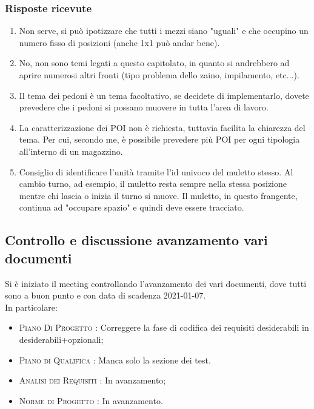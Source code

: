 \subsubsection{Risposte ricevute}
\begin{enumerate}
	\item Non serve, si può ipotizzare che tutti i mezzi siano "uguali" e che occupino un numero fisso di posizioni (anche 1x1 può andar bene).
	
	\item No, non sono temi legati a questo capitolato, in quanto si andrebbero ad aprire numerosi altri fronti (tipo problema dello zaino, impilamento, etc...).
	
	\item Il tema dei pedoni è un tema facoltativo, se decidete di implementarlo, dovete prevedere che i pedoni si possano muovere in tutta l'area di lavoro. 
	
	\item La caratterizzazione dei POI non è richiesta, tuttavia facilita la chiarezza del tema. Per cui, secondo me, è possibile prevedere più POI per ogni tipologia all'interno di un magazzino.
	
	\item Consiglio di identificare l'unità tramite l'id univoco del muletto stesso. Al cambio turno, ad esempio, il muletto resta sempre nella stessa posizione mentre chi lascia o inizia il turno si muove. Il muletto, in questo frangente, continua ad "occupare spazio" e quindi deve essere tracciato.
\end{enumerate}

\subsection{Controllo e discussione avanzamento vari documenti}
Si è iniziato il meeting controllando l'avanzamento dei vari documenti, dove tutti sono a buon punto e con data di scadenza 2021-01-07.\\
In particolare:
\begin{itemize}
	\item \textsc{Piano Di Progetto :} Correggere la fase di codifica dei requisiti desiderabili in desiderabili+opzionali;
	\item \textsc{Piano di Qualifica :} Manca solo la sezione dei test.
	\item \textsc{Analisi dei Requisiti :} In avanzamento;
	\item \textsc{Norme di Progetto :} In avanzamento.
\end{itemize}

